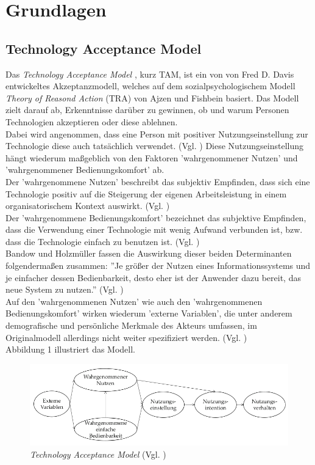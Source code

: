 \documentclass[deutsch]{lib/llncs/llncs}
\begin{document}
\newpage


\section{Grundlagen}


\subsection{Technology Acceptance Model}
Das \textit{Technology Acceptance Model} \cite{davis1985technology}, kurz TAM, ist ein von von Fred D. Davis entwickeltes Akzeptanzmodell, welches auf dem sozialpsychologischem Modell \textit{Theory of Reasond Action} (TRA) von Ajzen und Fishbein \cite{ajzen1980understanding} basiert. Das Modell zielt darauf ab, Erkenntnisse darüber zu gewinnen, ob und warum Personen Technologien akzeptieren oder diese ablehnen. \\
Dabei wird angenommen, dass eine Person mit positiver Nutzungseinstellung zur Technologie diese auch tatsächlich verwendet. (Vgl. \cite[S. 237]{bandow2010modell}) Diese Nutzungseinstellung hängt wiederum maßgeblich von den Faktoren 'wahrgenommener Nutzen' und 'wahrgenommener Bedienungskomfort' ab. \\
Der 'wahrgenommene Nutzen' beschreibt das subjektiv Empfinden, dass sich eine Technologie positiv auf die Steigerung der eigenen Arbeitsleistung in einem organisatorischem Kontext auswirkt.  (Vgl. \cite[S. 320]{Davis1989perceivedUsefulness}) \\
Der 'wahrgenommene Bedienungskomfort' bezeichnet das subjektive Empfinden, dass die Verwendung einer Technologie mit wenig Aufwand verbunden ist, bzw. dass die Technologie einfach zu benutzen ist. (Vgl. \cite[S. 320]{Davis1989perceivedUsefulness}) \\
Bandow und Holzmüller fassen die Auswirkung dieser beiden Determinanten folgendermaßen zusammen: ''Je größer der Nutzen eines Informationssystems und je einfacher dessen Bedienbarkeit, desto eher ist der Anwender dazu bereit, das neue System zu nutzen.'' (Vgl. \cite[S. 237]{bandow2010modell}) \\
Auf den 'wahrgenommenen Nutzen' wie auch den 'wahrgenommenen Bedienungskomfort' wirken wiederum 'externe Variablen', die unter anderem demografische und persönliche Merkmale des Akteurs umfassen, im Originalmodell allerdings nicht weiter spezifiziert werden. (Vgl. \cite[S. 21]{davis1985technology}) \\
Abbildung 1 illustriert das Modell.
\begin{figure}
	\centering
	\includegraphics[scale=0.40]{img/abbildung1.png}
	\caption{\textit{Technology Acceptance Model} (Vgl. \cite[S. 237]{bandow2010modell})}
\end{figure}
\end{document}
